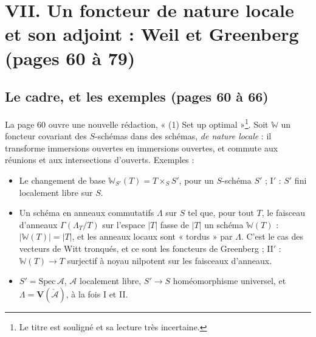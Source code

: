\documentclass[11pt,a4paper]{article}
\begin{document}
\section*{VII. Un foncteur de nature locale et son adjoint : Weil et Greenberg (pages 60 à 79)}

\subsection*{Le cadre, et les exemples (pages 60 à 66)}

La page 60 ouvre une nouvelle rédaction, « (1) Set up optimal »\footnote{Le
titre est souligné et sa lecture très incertaine.}. Soit $\mathbb{W}$ un
foncteur covariant des $S$-schémas dans des schémas, \emph{de nature locale} :
il transforme immersions ouvertes en immersions ouvertes, et commute aux
réunions et aux intersections d'ouverts. Exemples :

\begin{itemize}
  \item[I.] Le changement de base $\mathbb{W}_{S'}(T) = T \times_S S'$, pour un
  $S$-schéma $S'$ ; I$'$ : $S'$ fini localement libre sur $S$.
  \item[II.] Un schéma en anneaux commutatifs $\Lambda$ sur $S$ tel que, pour
  tout $T$, le faisceau d'anneaux $\Gamma(\Lambda_T/T)$ sur l'espace $|T|$ fasse de
  $|T|$ un schéma $\mathbb{W}(T)$ : $|\mathbb{W}(T)| = |T|$, et les anneaux
  locaux sont « tordus » par $\Lambda$. C'est le cas des vecteurs de Witt
  tronqués, et ce sont les foncteurs de Greenberg ; II$'$ : $\mathbb{W}(T) \to
  T$ surjectif à noyau nilpotent sur les faisceaux d'anneaux.
  \item[III.] $S' = \mathrm{Spec}\,\mathcal{A}$, $\mathcal{A}$ localement libre,
  $S' \to S$ homéomorphisme universel, et $\Lambda = \mathbf{V}(\check{\mathcal{A}})$,
  à la fois I et II.
\end{itemize}
\end{document}

